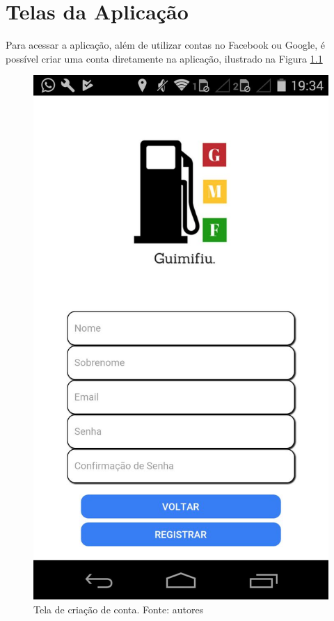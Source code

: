 
\chapter{Telas da Aplicação}
\label{chap:telas}

Para acessar a aplicação, além de utilizar contas no Facebook ou Google, é possível criar uma conta diretamente na aplicação, ilustrado na Figura \ref{img:tela-criacao}

\begin{figure}[H]
    \centering
    \includegraphics[scale=0.3]{figuras/tela-criacao.jpeg}
    \caption[Tela de criação de conta]{Tela de criação de conta. Fonte: autores}
    \label{img:tela-criacao}
\end{figure}


